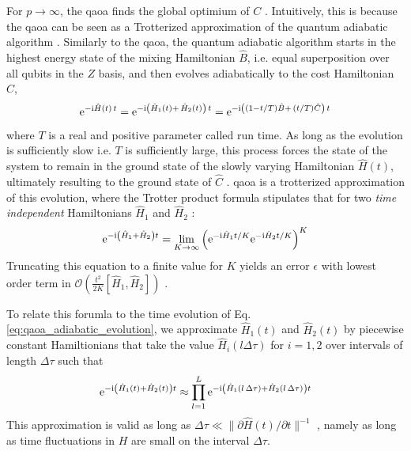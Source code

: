 For $p \rightarrow \infty$, the \gls{qaoa} finds the global optimium of $C$ \cite{Farhi2014AAlgorithm}. Intuitively, this is because the \gls{qaoa} can be seen as a Trotterized approximation \cite{TrotterMathematics} of the quantum adiabatic algorithm \cite{Farhi2000QuantumEvolution}. Similarly to the \gls{qaoa}, the quantum adiabatic algorithm starts in the highest energy state of the mixing Hamiltonian $\hat B$, i.e. equal superposition over all qubits in the $Z$ basis, and then evolves adiabatically to the cost Hamiltonian $\hat C$,
\begin{equation} \label{eq:qaoa_adiabatic_evolution}
\mathrm e^{-\mathrm i \hat H(t)\,t}= \mathrm e^{-\mathrm i \left(\hat H_1(t) +\, \hat H_2(t)\right) \, t} = \mathrm e^{-\mathrm i \left((1-t / T) \hat B+ \, (t / T) \hat C\right)\, t}
\end{equation}
where $T$ is a real and positive parameter called run time. As long as the evolution is sufficiently slow i.e. $T$ is sufficiently large, this process forces the state of the system to remain in the ground state of the slowly varying Hamiltonian $\hat H(t)$, ultimately resulting to the ground state of $\hat C$ \cite{Farhi2000QuantumEvolution, Farhi2014AAlgorithm}. \gls{qaoa} is a trotterized approximation of this evolution, where the Trotter product formula stipulates that for two \textit{time independent} Hamiltonians $\hat H_1$ and $\hat H_2$ \cite{TrotterMathematics}:
\begin{equation} \label{eq:qaoa_product_formula}
    \mathrm e^{-\mathrm i\left(\hat H_{1} + \hat H_{2}\right) t}=\lim _{K \rightarrow \infty}\left(\mathrm e^{-\mathrm i \hat H_{1} t / K} \mathrm e^{-\mathrm i \hat H_{2} t / K}\right)^{K}
\end{equation}
Truncating this equation to a finite value for  $K$ yields an error $\epsilon$ with lowest order term in $\mathcal{O}\left(\frac{t^2}{2K} [\hat H_1, \hat H_2]\right)$ \cite{Heyl2018QuantumSimulation, Lloyd1996UniversalSimulators}.

To relate this forumla to the time evolution of Eq. \eqref{eq:qaoa_adiabatic_evolution}, we approximate $\hat H_1(t)$ and $\hat H_2(t)$ by piecewise constant Hamiltionians that take the value $\hat H_i(l\Delta \tau)$ for $i = 1,2$ over intervals of length $\Delta \tau$ such that
\begin{equation} \label{eq:qaoa_discretization}
    \mathrm e^{-\mathrm i\left(\hat H_{1}(t) + \hat H_{2}(t)\right) t} \approx \prod_{l = 1}^L \mathrm e^{-\mathrm i\left(\hat H_{1}(l\,\Delta \tau) + \hat H_{2}(l\,\Delta \tau)\right) t}
\end{equation}
This approximation is valid as long as $\Delta \tau \ll\|\partial \hat H(t) / \partial t\|^{-1}$ \cite{Poulin2011QuantumSpace}, namely as long as time fluctuations in $H$ are small on the interval $\Delta \tau$.

